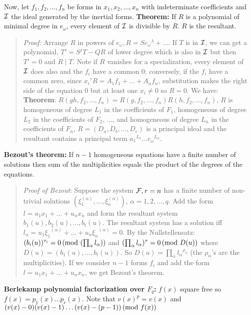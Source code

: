 Now, let $f_1, f_2, \ldots, f_n$ be forms in $x_1, x_2, \ldots, x_n$ with indeterminate
coefficients and ${\cal I}$ the ideal generated by the inertial forms.  
{\bf Theorem:} If $R$ is a polynomial of minimal degree in $e_{\omega}$, every element of 
${\cal I}$ is divisible by $R$.  $R$ is the resultant.  
\begin{quote}
\emph{Proof:} Arrange $R$ in powers of
$e_{\omega}, R= S {e_{\omega}}^{\lambda} + \ldots $.  If $T$ is in ${\cal I}$, we can
get a polynomial, $T'=S^jT-QR$ of lower degree which is also in ${\cal I}$ but then $T'=0$ and
$R \mid T$.  Note if $R$ vanishes for a specialization, every element of ${\cal I}$
does also and the $f_i$ have a common 0; 
conversely, if the $f_i$ have a common zero, since
${x_i}^{\tau}R = A_1 f_1 + \ldots + A_n f_n$, substitution makes the right side of
the equation $0$ but at least one $x_i \ne 0$ so $R=0$.  We have:
{\bf Theorem}:
$R(gh,f_2, \ldots, f_n)= R(g,f_2, \ldots, f_n) R(h,f_2, \ldots, f_n)$, $R$ is
homogeneous of degree $L_1$ in the coefficients of $F_1$,
homogeneous of degree $L_2$ in the coefficients of $F_2$, ..., 
and homogeneous of degree $L_n$ in the coefficients of $F_n$,
$R= (D_a, D_b, \ldots, D_e)$ is a principal ideal
and the resultant contains a principal term
${a_1}^{L_1} \ldots {e_{\omega}}^{L_n}$.
\end{quote}
{\bf Bezout's theorem:}  If $n-1$ homogeneous equations have a finite number of solutions
then sum of the multiplicities equals 
the product of the degrees of the equations.
\begin{quote}
\emph{Proof of Bezout}:  Suppose the system ${\cal F}, r=n$ has a finite 
number of non-trivial
solutions $(\xi_1^{(\alpha)}, \ldots, \xi_n^{(\alpha)})$, $\alpha= 1,2, \ldots, q$.
Add the form $l= u_1 x_1 + \ldots + u_n x_n$ and form the resultant system $b_1(u),
b_2(u), \ldots, b_t(u)$.  The resultant system has a solution iff
$l_{\alpha}= u_1 {\xi_1}^{(\alpha)} + \ldots + u_n {\xi_n}^{(\alpha)} =0$.  By
the Nullstellensatz: 
$(b_i(u))^{\tau_i} = 0 \thinspace \textnormal{(mod }  (\prod_{\alpha} l_{\alpha}) \textnormal{)}$ and
$(\prod_{\alpha} l_{\alpha})^{\tau}= 0 \thinspace \textnormal{(mod } D(u) \textnormal{)}$ where
$D(u) = ( b_1(u), \ldots, b_t(u))$.  So $D(u)= \prod_{\alpha} {l_{\alpha}}^{\rho_{\alpha}}$
(the $\rho_{\alpha}$'s are the multiplicities).
If we consider $n-1$ forms $f_i$ and add the form $l=u_1 x_1 + \ldots + u_n x_n$, we get
Bezout's theorem.
\end{quote}
{\bf Berlekamp polynomial factorization over $F_q$:} $f(x)$ square free so
$f(x)= p_1(x) \ldots p_r(x)$. 
Note that $v(x)^p=v(x)$ and $(v(x)-0)(v(x)-1) \ldots (v(x)-(p-1)) \thinspace \textnormal{(mod } f(x) \textnormal{)}$
